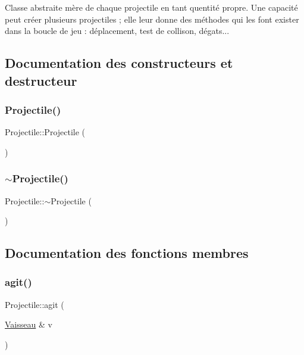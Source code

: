 Classe abstraite mère de chaque projectile en tant qu\textquotesingle{}entité propre. Une capacité peut créer plusieurs projectiles ; elle leur donne des méthodes qui les font exister dans la boucle de jeu \+: déplacement, test de collison, dégats... 

\subsection{Documentation des constructeurs et destructeur}
\mbox{\label{class_projectile_ac536ed2aad56af866a2078b9a85aa16d}} 
\subsubsection{\texorpdfstring{Projectile()}{Projectile()}}
{\footnotesize\ttfamily Projectile\+::\+Projectile (\begin{DoxyParamCaption}{ }\end{DoxyParamCaption})}

\mbox{\label{class_projectile_a94903e021fa2edab60ba3836ca0b937d}} 
\subsubsection{\texorpdfstring{$\sim$\+Projectile()}{~Projectile()}}
{\footnotesize\ttfamily Projectile\+::$\sim$\+Projectile (\begin{DoxyParamCaption}{ }\end{DoxyParamCaption})}



\subsection{Documentation des fonctions membres}
\mbox{\label{class_projectile_a8550c8b1b012c5c290fb6da5b06f57ef}} 
\subsubsection{\texorpdfstring{agit()}{agit()}}
{\footnotesize\ttfamily Projectile\+::agit (\begin{DoxyParamCaption}\item[{\hyperlink{class_vaisseau}{Vaisseau} \&}]{v }\end{DoxyParamCaption})\hspace{0.3cm}{\ttfamily [pure virtual]}}



